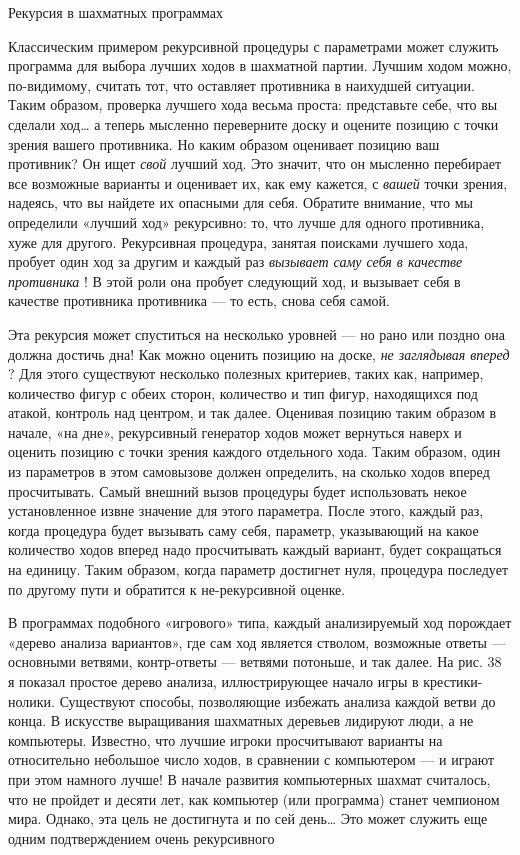 Рекурсия в шахматных программах

Классическим примером рекурсивной процедуры с параметрами может служить программа для выбора лучших ходов в шахматной партии. Лучшим ходом можно, по-видимому, считать тот, что оставляет противника в наихудшей ситуации. Таким образом, проверка лучшего хода весьма проста: представьте себе, что вы сделали ход\ldots{} а теперь мысленно переверните доску и оцените позицию с точки зрения вашего противника. Но каким образом оценивает позицию ваш противник? Он ищет \emph{свой} лучший ход. Это значит, что он мысленно перебирает все возможные варианты и оценивает их, как ему кажется, с \emph{вашей} точки зрения, надеясь, что вы найдете их опасными для себя. Обратите внимание, что мы определили «лучший ход» рекурсивно: то, что лучше для одного противника, хуже для другого. Рекурсивная процедура, занятая поисками лучшего хода, пробует один ход за другим и каждый раз \emph{вызывает саму себя в качестве противника} ! В этой роли она пробует следующий ход, и вызывает себя в качестве противника противника --- то есть, снова себя самой.

Эта рекурсия может спуститься на несколько уровней --- но рано или поздно она должна достичь дна! Как можно оценить позицию на доске, \emph{не заглядывая вперед} ? Для этого существуют несколько полезных критериев, таких как, например, количество фигур с обеих сторон, количество и тип фигур, находящихся под атакой, контроль над центром, и так далее. Оценивая позицию таким образом в начале, «на дне», рекурсивный генератор ходов может вернуться наверх и оценить позицию с точки зрения каждого отдельного хода. Таким образом, один из параметров в этом самовызове должен определить, на сколько ходов вперед просчитывать. Самый внешний вызов процедуры будет использовать некое установленное извне значение для этого параметра. После этого, каждый раз, когда процедура будет вызывать саму себя, параметр, указывающий на какое количество ходов вперед надо просчитывать каждый вариант, будет сокращаться на единицу. Таким образом, когда параметр достигнет нуля, процедура последует по другому пути и обратится к не-рекурсивной оценке.

В программах подобного «игрового» типа, каждый анализируемый ход порождает «дерево анализа вариантов», где сам ход является стволом, возможные ответы --- основными ветвями, контр-ответы --- ветвями потоньше, и так далее. На рис. 38 я показал простое дерево анализа, иллюстрирующее начало игры в крестики-нолики. Существуют способы, позволяющие избежать анализа каждой ветви до конца. В искусстве выращивания шахматных деревьев лидируют люди, а не компьютеры. Известно, что лучшие игроки просчитывают варианты на относительно небольшое число ходов, в сравнении с компьютером --- и играют при этом намного лучше! В начале развития компьютерных шахмат считалось, что не пройдет и десяти лет, как компьютер (или программа) станет чемпионом мира. Однако, эта цель не достигнута и по сей день\ldots{} Это может служить еще одним подтверждением очень рекурсивного

